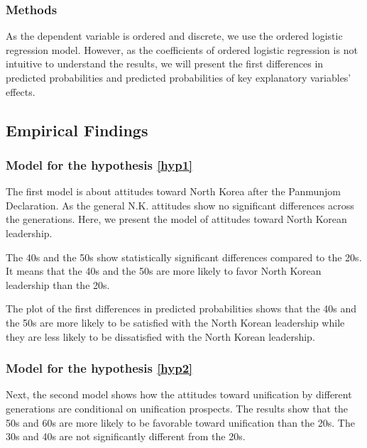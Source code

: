 \documentclass[letterpaper,10pt,twocolumn,twoside,]{pinp}
\begin{document}
\hypertarget{methods}{%
\subsubsection{Methods}\label{methods}}

As the dependent variable is ordered and discrete, we use the ordered
logistic regression model. However, as the coefficients of ordered
logistic regression is not intuitive to understand the results, we will
present the first differences in predicted probabilities and predicted
probabilities of key explanatory variables' effects.

\hypertarget{empirical-findings}{%
\subsection{Empirical Findings}\label{empirical-findings}}

\hypertarget{model-for-the-hypothesis}{%
\subsubsection{\texorpdfstring{Model for the hypothesis
\ref{hyp1}}{Model for the hypothesis }}\label{model-for-the-hypothesis}}

The first model is about attitudes toward North Korea after the
Panmunjom Declaration. As the general N.K. attitudes show no significant
differences across the generations. Here, we present the model of
attitudes toward North Korean leadership.

The 40s and the 50s show statistically significant differences compared
to the 20s. It means that the 40s and the 50s are more likely to favor
North Korean leadership than the 20s.

The plot of the first differences in predicted probabilities shows that
the 40s and the 50s are more likely to be satisfied with the North
Korean leadership while they are less likely to be dissatisfied with the
North Korean leadership.

\hypertarget{model-for-the-hypothesis-1}{%
\subsubsection{\texorpdfstring{Model for the hypothesis
\ref{hyp2}}{Model for the hypothesis }}\label{model-for-the-hypothesis-1}}

Next, the second model shows how the attitudes toward unification by
different generations are conditional on unification prospects. The
results show that the 50s and 60s are more likely to be favorable toward
unification than the 20s. The 30s and 40s are not significantly
different from the 20s.
\end{document}
